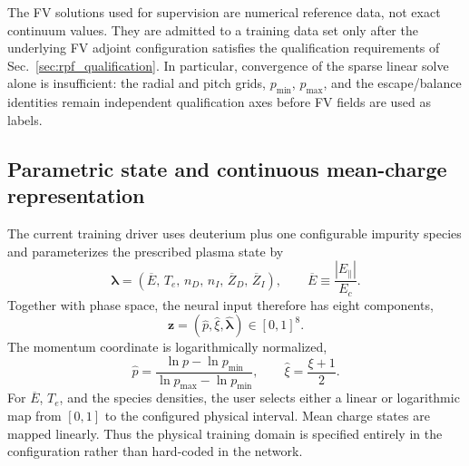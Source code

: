 \documentclass[11pt]{article}
\begin{document}
The FV solutions used for supervision are numerical reference data, not exact continuum
values.  They are admitted to a training data set only after the underlying FV adjoint
configuration satisfies the qualification requirements of
Sec.~\ref{sec:rpf_qualification}.  In particular, convergence of the sparse linear solve
alone is insufficient: the radial and pitch grids, $p_{\min}$, $p_{\max}$, and the
escape/balance identities remain independent qualification axes before FV fields are
used as labels.

\subsection{Parametric state and continuous mean-charge representation}
\label{sec:pinn_parameters}

The current training driver uses deuterium plus one configurable impurity species and
parameterizes the prescribed plasma state by
\begin{equation}
 \bm\lambda
 =\left(
   \overline E,\,
   T_e,\,
   n_D,\,
   n_I,\,
   \overline Z_D,\,
   \overline Z_I
  \right),
 \qquad
 \overline E\equiv\frac{|E_\parallel|}{E_c}.
 \label{eq:pinn_parameter_vector}
\end{equation}
Together with phase space, the neural input therefore has eight components,
\begin{equation}
 \bm z
 =\left(\widehat p,\widehat\xi,\widehat{\bm\lambda}\right)
 \in[0,1]^8.
 \label{eq:pinn_eight_dimensional_input}
\end{equation}
The momentum coordinate is logarithmically normalized,
\begin{equation}
 \widehat p
 =\frac{\ln p-\ln p_{\min}}
        {\ln p_{\max}-\ln p_{\min}},
 \qquad
 \widehat\xi=\frac{\xi+1}{2}.
 \label{eq:pinn_phase_normalization}
\end{equation}
For $\overline E$, $T_e$, and the species densities, the user selects either a linear or
logarithmic map from $[0,1]$ to the configured physical interval.  Mean charge states
are mapped linearly.  Thus the physical training domain is specified entirely in the
configuration rather than hard-coded in the network.
\end{document}
